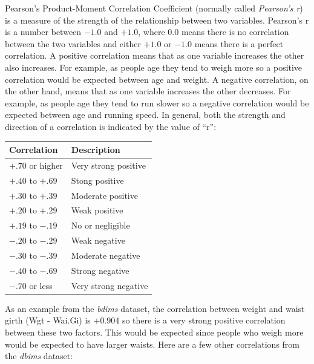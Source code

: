 Pearson's Product-Moment Correlation Coefficient (normally called \textit{Pearson's r}) is a measure of the strength of the relationship between two variables. Pearson's r is a number between $ -1.0 $ and $ +1.0 $, where $ 0.0 $ means there is no correlation between the two variables and either $ +1.0 $ or $ -1.0 $ means there is a perfect correlation. A positive correlation means that as one variable increases the other also increases. For example, as people age they tend to weigh more so a positive correlation would be expected between age and weight. A negative correlation, on the other hand, means that as one variable increases the other decreases. For example, as people age they tend to run slower so a negative correlation would be expected between age and running speed. In general, both the strength and direction of a correlation is indicated by the value of ``r'':

\begin{center}
  \begin{tabular}{ll}
    \hline 
    \textbf{Correlation} & \textbf{Description}  \\ 
    \hline 
    $ +.70 $ or higher & Very strong positive  \\ 
    $ +.40 $ to $ +.69 $ & Stong positive \\ 
    $ +.30 $ to $ +.39 $ & Moderate positive \\ 
    $ +.20 $ to $ +.29 $ & Weak positive \\ 
    $ +.19 $ to $ -.19 $ & No or negligible \\ 
    $ -.20 $ to $ -.29 $ & Weak negative \\ 
    $ -.30 $ to $ -.39 $ & Moderate negative \\ 
    $ -.40 $ to $ -.69 $ & Strong negative \\ 
    $ -.70 $ or less & Very strong negative \\ 
    \hline 
  \end{tabular} 
\end{center}

As an example from the \textit{bdims} dataset, the correlation between weight and waist girth (Wgt - Wai.Gi) is $ +0.904 $ so there is a very strong positive correlation between these two factors. This would be expected since people who weigh more would be expected to have larger waists. Here are a few other correlations from the \textit{dbims} dataset:

